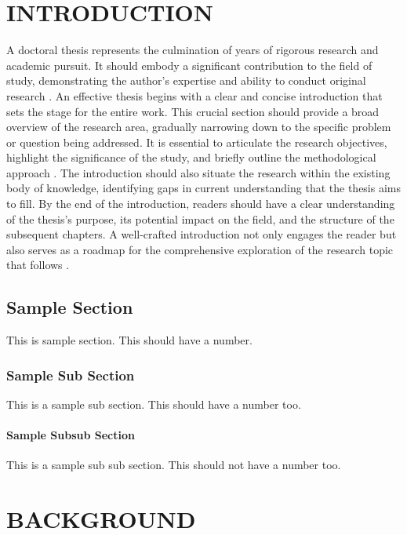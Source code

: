 \documentclass{kgtu}
\begin{document}
\chapter{INTRODUCTION}
A doctoral thesis represents the culmination of years of rigorous research and academic pursuit. It should embody a significant contribution to the field of study, demonstrating the author's expertise and ability to conduct original research \cite{oztoprak2023technological}. An effective thesis begins with a clear and concise introduction that sets the stage for the entire work. This crucial section should provide a broad overview of the research area, gradually narrowing down to the specific problem or question being addressed. It is essential to articulate the research objectives, highlight the significance of the study, and briefly outline the methodological approach \cite{butun2021application}. The introduction should also situate the research within the existing body of knowledge, identifying gaps in current understanding that the thesis aims to fill. By the end of the introduction, readers should have a clear understanding of the thesis's purpose, its potential impact on the field, and the structure of the subsequent chapters. A well-crafted introduction not only engages the reader but also serves as a roadmap for the comprehensive exploration of the research topic that follows \cite{oztoprak2023holistic}.
\section{Sample Section}
This is sample section. This should have a number.
\lipsum[1-3]
\subsection{Sample Sub Section}
This is a sample sub section. This should have a number too.
\lipsum[4-5]
\subsubsection{Sample Subsub Section}
This is a sample sub sub section. This should not have a number too.
\lipsum[6-7]
\chapter{BACKGROUND}
\end{document}
